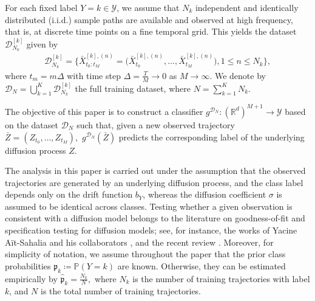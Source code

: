 \documentclass{article}
\theoremstyle{plain}
\theoremstyle{definition}
\theoremstyle{remark}
\newcommand{\calY}{\mathcal{Y}}
\newcommand{\rr}{\color{red}}
\newcommand{\black}{\color{black}}
\begin{document}

For each fixed label $Y=k\in\mathcal{Y}$, we assume that $N_k$ independent and identically distributed (i.i.d.) sample paths are available and observed at high frequency, that is, at discrete time points on a fine temporal grid. This yields the dataset  $\mathcal{D}_{N_k}^{[k]}$ given by
\begin{align}
 \mathcal{D}_{N_k}^{[k]}
 =
 \Big\{
 \bar{X}^{[k],(n)}_{t_0:t_M}
 \!=\!
 \big(
\bar X^{[k],(n)}_{t_0}\!\!,
 \dots,
\bar X^{[k],(n)}_{t_M}
 \big),   
 1\!\le\! n\!\le\! {N_k}
 \Big\},\nonumber
\end{align}
where $t_m = m\Delta$ with time step $\Delta = \tfrac{T}{M} \to 0$ as $M \to \infty$. We denote by $\mathcal{D}_N = \bigcup_{k=1}^K \mathcal{D}_{N_k}^{[k]}$ the full training dataset, where $N=\sum_{k=1}^{K}N_k$.


The objective of this paper is to construct a classifier
$
g^{\mathcal{D}_N} : (\mathbb{R}^d)^{M+1} \to \mathcal{Y}
$
based on the dataset $\mathcal{D}_N$ such that, given a new observed trajectory
$
\bar Z = (Z_{t_0}, \dots, Z_{t_M}),
$
$g^{\mathcal{D}_N}(\bar Z)$ predicts the corresponding label of the underlying diffusion process $Z$.



The analysis in this paper is carried out under the assumption that the observed trajectories are generated by an underlying diffusion process, and the class label depends only on the drift function \(b_Y\), whereas the diffusion coefficient \(\sigma\) is assumed to be identical across classes. 
Testing whether a given observation is consistent with a diffusion model belongs to the literature on goodness-of-fit and specification testing for diffusion models; see, for instance, the works of Yacine Aït-Sahalia and his collaborators \cite{ait2002telling, MR2488349, AITSAHALIA2018233, MR2722466}, and the recent review \citet{lopezreview}. Moreover, for simplicity of notation, we assume throughout the paper that the prior class probabilities
$
\mathfrak{p}_k \coloneqq \mathbb{P}(Y = k)
$
are known. Otherwise, they can be estimated empirically by
$
\widehat{\mathfrak{p}}_k = \frac{N_k}{N},
$
where \(N_k\) is the number of training trajectories with label \(k\), and \(N\) is the total number of training trajectories.
\end{document}
